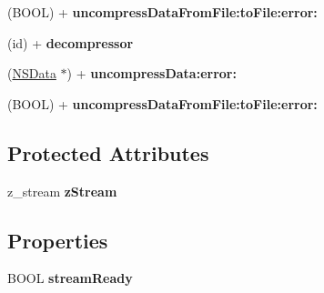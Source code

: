 \begin{DoxyCompactItemize}
\item 
\hypertarget{interface_a_s_i_data_decompressor_ade3cc9ba926998aa996714734667a7af}{
(\-B\-O\-O\-L) + {\bfseries uncompress\-Data\-From\-File\-:to\-File\-:error\-:}}
\label{interface_a_s_i_data_decompressor_ade3cc9ba926998aa996714734667a7af}

\item 
\hypertarget{interface_a_s_i_data_decompressor_a1d8177f77b67ffe4651a0310acd667c9}{
(id) + {\bfseries decompressor}}
\label{interface_a_s_i_data_decompressor_a1d8177f77b67ffe4651a0310acd667c9}

\item 
\hypertarget{interface_a_s_i_data_decompressor_ab666cc2cd675eca62a094bb837616a8e}{
(\hyperlink{class_n_s_data}{\-N\-S\-Data} $\ast$) + {\bfseries uncompress\-Data\-:error\-:}}
\label{interface_a_s_i_data_decompressor_ab666cc2cd675eca62a094bb837616a8e}

\item 
\hypertarget{interface_a_s_i_data_decompressor_ade3cc9ba926998aa996714734667a7af}{
(\-B\-O\-O\-L) + {\bfseries uncompress\-Data\-From\-File\-:to\-File\-:error\-:}}
\label{interface_a_s_i_data_decompressor_ade3cc9ba926998aa996714734667a7af}

\end{DoxyCompactItemize}
\subsection*{\-Protected \-Attributes}
\begin{DoxyCompactItemize}
\item 
\hypertarget{interface_a_s_i_data_decompressor_a208c942dbcbebdbdae6768f7ca16810c}{
z\-\_\-stream {\bfseries z\-Stream}}
\label{interface_a_s_i_data_decompressor_a208c942dbcbebdbdae6768f7ca16810c}

\end{DoxyCompactItemize}
\subsection*{\-Properties}
\begin{DoxyCompactItemize}
\item 
\hypertarget{interface_a_s_i_data_decompressor_a6b324665e512db2772a769f3a173003b}{
\-B\-O\-O\-L {\bfseries stream\-Ready}}
\label{interface_a_s_i_data_decompressor_a6b324665e512db2772a769f3a173003b}

\end{DoxyCompactItemize}


